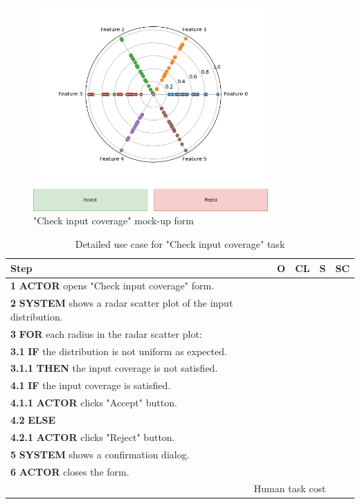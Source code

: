\begin{figure}[H]
\centering
\includegraphics[width=0.8\textwidth]{figures/check_input_coverage.png}
\caption{"Check input coverage" mock-up form}
\end{figure}

\begin{table}[H]
\centering
\begin{tabular}{|l|c|c|c|c|}
\hline
\textbf{Step} & \textbf{O} & \textbf{CL} & \textbf{S} & \textbf{SC} \\
\hline
\textbf{1} \textbf{ACTOR} opens "Check input coverage" form. & & & & \\
\hline
\textbf{2} \textbf{SYSTEM} shows a radar scatter plot of the input distribution. & & & & \\
\hline
\textbf{3} \textbf{FOR} each radius in the radar scatter plot: & & & & \\
\hline
\textbf{3.1} \textbf{IF} the distribution is not uniform as expected. & & & & \\
\hline
\textbf{3.1.1} \textbf{THEN} the input coverage is not satisfied. & & & & \\
\hline
\textbf{4.1} \textbf{IF} the input coverage is satisfied. & & & & \\
\hline
\textbf{4.1.1} \textbf{ACTOR} clicks "Accept" button. & & & & \\
\hline
\textbf{4.2} \textbf{ELSE} & & & & \\
\hline
\textbf{4.2.1} \textbf{ACTOR} clicks "Reject" button. & & & & \\
\hline
\textbf{5} \textbf{SYSTEM} shows a confirmation dialog. & & & & \\
\hline
\textbf{6} \textbf{ACTOR} closes the form. & & & & \\
\hline
\multicolumn{4}{|r|}{Human task cost} & \\
\hline
\end{tabular}
\caption{Detailed use case for "Check input coverage" task}
\label{table:check_input_coverage}
\end{table}

